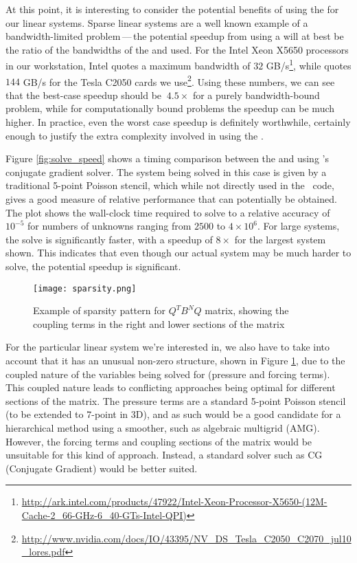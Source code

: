 At this point, it is interesting to consider the potential benefits of using the {\gpu} for our linear systems. Sparse linear systems are a well known example of a bandwidth-limited problem\,---\,the potential speedup from using a {\gpu} will at best be the ratio of the bandwidths of the {\cpu} and {\gpu} used. For the Intel Xeon X5650 processors in our workstation, Intel quotes a maximum bandwidth of $32$ GB/s\footnote{\href{http://ark.intel.com/products/47922/Intel-Xeon-Processor-X5650-(12M-Cache-2_66-GHz-6_40-GTs-Intel-QPI)}{http://ark.intel.com/products/47922/Intel-Xeon-Processor-X5650-(12M-Cache-2\_66-GHz-6\_40-GTs-Intel-QPI)}}, while {\NV} quotes $144$ GB/s for the Tesla C2050 cards we use\footnote{\href{http://www.nvidia.com/docs/IO/43395/NV_DS_Tesla_C2050_C2070_jul10_lores.pdf}{http://www.nvidia.com/docs/IO/43395/NV\_DS\_Tesla\_C2050\_C2070\_jul10\_lores.pdf}}. Using these numbers, we can see that the best-case speedup should be $~4.5\times$ for a purely bandwidth-bound problem, while for computationally bound problems the speedup can be much higher. In practice, even the worst case speedup is definitely worthwhile, certainly enough to justify the extra complexity involved in using the {\gpu}.

Figure \ref{fig:solve_speed} shows a timing comparison between the {\cpu} and {\gpu} using {\cusp}'s conjugate gradient solver. The system being solved in this case is given by a traditional 5-point Poisson stencil, which while not directly used in the \ibm\ code, gives a good measure of relative performance that can potentially be obtained. The plot shows the wall-clock time required to solve to a relative accuracy of $10^{-5}$ for numbers of unknowns ranging from $2500$ to $4\times 10^6$. For large systems, the {\gpu} solve is significantly faster, with a speedup of $8\times$ for the largest system shown. This indicates that even though our actual system may be much harder to solve, the potential speedup is significant.

\begin{figure}[h]\centering
	\texttt{[image: sparsity.png]}
	\caption{\small Example of sparsity pattern for $Q^{T}B^{N}Q$ matrix, showing the coupling terms in the right and lower sections of the matrix}
\label{fig:sparsity}
\end{figure}

For the particular linear system we're interested in, we also have to take into account that it has an unusual non-zero structure, shown in Figure \ref{fig:sparsity}, due to the coupled nature of the variables being solved for (pressure and forcing terms). This coupled nature leads to conflicting approaches being optimal for different sections of the matrix. The pressure terms are a standard 5-point Poisson stencil (to be extended to 7-point in 3D), and as such would be a good candidate for a hierarchical method using a smoother, such as algebraic multigrid (AMG). However, the forcing terms and coupling sections of the matrix would be unsuitable for this kind of approach. Instead, a standard solver such as CG (Conjugate Gradient) would be better suited.

